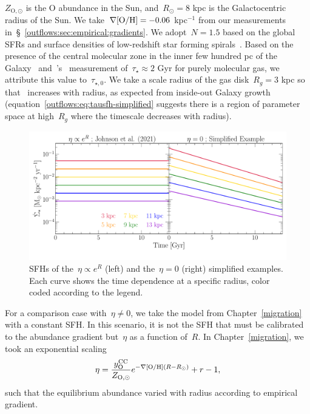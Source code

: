 $Z_{\text{O},\odot}$ is the O abundance in the Sun, and~$R_\odot = 8$ kpc is
the Galactocentric radius of the Sun.
We take~$\nabla\text{[O/H]} = -0.06$ kpc$^{-1}$ from our measurements
in~\S~\ref{outflows:sec:empirical:gradients}.
We adopt~$N = 1.5$ based on the global SFRs and surface densities of
low-redshift star forming spirals~\citep{Kennicutt1998}.
Based on the presence of the central molecular zone in the inner few hundred
pc of the Galaxy~\citep[e.g.,][]{Morris1996, Dahmen1998, PiercePrice2000,
Hatchfield2020} and~\citeauthor{Leroy2008}'s~\citeyearpar{Leroy2008}
measurement of~$\tau_\star \approx 2$ Gyr for purely molecular gas, we
attribute this value to~$\tau_{\star,0}$.
We take a scale radius of the gas disk~$R_g = 3$ kpc so that~
increases with radius, as expected from inside-out Galaxy growth
(equation~\ref{outflows:eq:tausfh-simplified} suggests there is a region of
parameter space at high~$R_g$ where the timescale decreases with radius).

\begin{figure}
\centering
\includegraphics[scale = 0.5]{simplified-examples-sfhs.pdf}
\caption{
SFHs of the~$\eta \propto e^R$ (left) and the~$\eta = 0$ (right) simplified
examples.
Each curve shows the time dependence at a specific radius, color coded
according to the legend.
}
\label{outflows:fig:simplified-examples-sfhs}
\end{figure}

For a comparison case with~$\eta \neq 0$, we take the model from
Chapter~\ref{migration} with a constant SFH.
In this scenario, it is not the SFH that must be calibrated to the abundance
gradient but~$\eta$ as a function of~$R$.
In Chapter~\ref{migration}, we took an exponential scaling
\begin{equation}
\eta = \frac{y_\text{O}^\text{CC}}{Z_{\text{O},\odot}}
e^{-\nabla\text{[O/H]}(R - R_\odot)} + r - 1,
\end{equation}
such that the equilibrium abundance varied with radius according to empirical
gradient.

